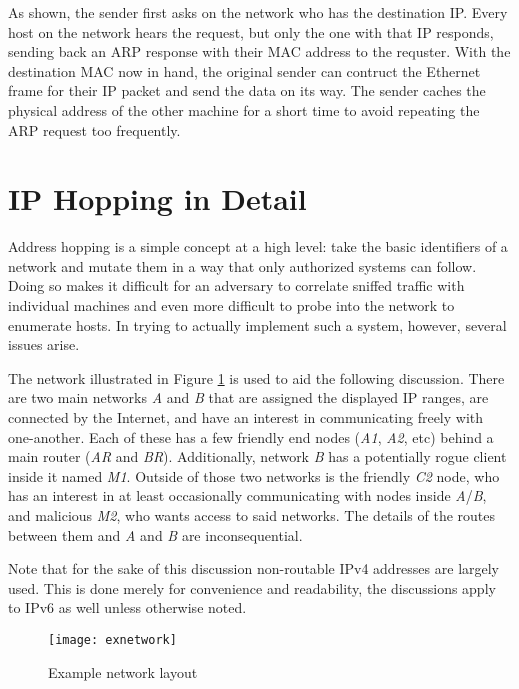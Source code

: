 \par As shown, the sender first asks on the network who has the destination \ac{IP}. Every host on the network hears the request, but only the one with that \ac{IP} responds, sending back an \ac{ARP} response with their \ac{MAC} address to the requster. With the destination \ac{MAC} now in hand, the original sender can contruct the Ethernet frame for their \ac{IP} packet and send the data on its way. The sender caches the physical address of the other machine for a short time to avoid repeating the \ac{ARP} request too frequently.

\section{IP Hopping in Detail}
\label{sec:hopping}
\par Address hopping is a simple concept at a high level: take the basic identifiers of a network and mutate them in a way that only authorized systems can follow. Doing so makes it difficult for an adversary to correlate sniffed traffic with individual machines and even more difficult to probe into the network to enumerate hosts. In trying to actually implement such a system, however, several issues arise. 

\par The network illustrated in Figure \ref{fig:exnetwork} is used to aid the following discussion. There are two main networks \textit{A} and \textit{B} that are assigned the displayed IP ranges, are connected by the Internet, and have an interest in communicating freely with one-another. Each of these has a few friendly end nodes (\textit{A1}, \textit{A2}, etc) behind a main router (\textit{AR} and \textit{BR}). Additionally, network \textit{B} has a potentially rogue client inside it named \textit{M1}. Outside of those two networks is the friendly \textit{C2} node, who has an interest in at least occasionally communicating with nodes inside \textit{A}/\textit{B}, and malicious \textit{M2}, who wants access to said networks. The details of the routes between them and \textit{A} and \textit{B} are inconsequential.

\par Note that for the sake of this discussion non-routable \ac{IPv4} addresses are largely used. This is done merely for convenience and readability, the discussions apply to \ac{IPv6} as well unless otherwise noted.

\begin{figure}
	\centering
	\texttt{[image: exnetwork]}
	\caption{Example network layout }
	\label{fig:exnetwork}
\end{figure}

